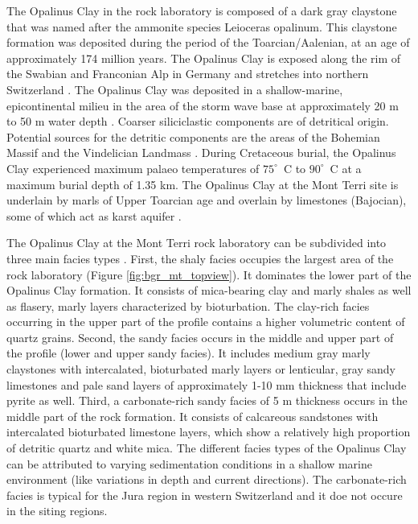 The Opalinus Clay in the rock laboratory is composed of a dark gray claystone that was named after the ammonite species Leioceras opalinum. This claystone formation was deposited during the period of the Toarcian/Aalenian, at an age of approximately 174 million years. The Opalinus Clay is exposed along the rim of the Swabian and Franconian Alp in Germany and stretches into northern Switzerland \cite{einsele1983}. The Opalinus Clay was deposited in a shallow-marine, epicontinental milieu in the area of the storm wave base at approximately 20 m to 50 m water depth \cite{wetzel2003}. Coarser siliciclastic components are of detritical origin. Potential sources for the detritic components are the areas of the Bohemian Massif and the Vindelician Landmass \cite{wetzel2003}. During Cretaceous burial, the Opalinus Clay experienced maximum palaeo temperatures of $75^{\circ}$~C to $90^{\circ}$~C \cite{bossart2008} at a maximum burial depth of 1.35 km. The Opalinus Clay at the Mont Terri site is underlain by  marls of Upper Toarcian age and overlain by limestones (Bajocian), some of which act as karst aquifer \cite{pearson2003}.

The Opalinus Clay at the Mont Terri rock laboratory can be subdivided into three main facies types \cite{bossart2008}. First, the shaly facies occupies the largest area of the rock laboratory (Figure \ref{fig:bgr_mt_topview}). It dominates the lower part of the Opalinus Clay formation. It consists of mica-bearing clay and marly shales as well as flasery, marly layers characterized by bioturbation. The clay-rich facies occurring in the upper part of the profile contains a higher volumetric content of quartz grains. Second, the sandy facies occurs in the middle and upper part of the profile (lower and upper sandy facies). It includes medium gray marly claystones with intercalated, bioturbated marly layers or lenticular, gray sandy limestones and pale sand layers of approximately 1-10 mm thickness that include pyrite as well. Third, a carbonate-rich sandy facies of 5 m thickness occurs in the middle part of the rock formation. It consists of calcareous sandstones with intercalated bioturbated limestone layers, which show a relatively high proportion of detritic quartz and white mica. The different facies types of the Opalinus Clay can be attributed to varying sedimentation conditions in a shallow marine environment (like variations in depth and current directions). The carbonate-rich facies is typical for the Jura region in western Switzerland and it doe not occure in the siting regions.

